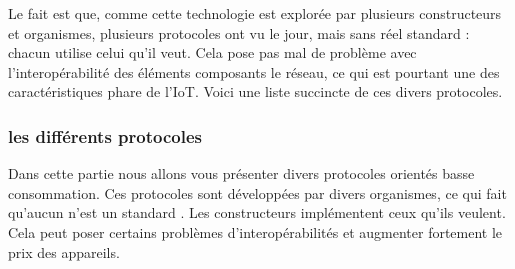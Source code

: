 Le fait est que, comme cette technologie est explorée par plusieurs constructeurs et organismes, plusieurs protocoles ont vu le jour, mais sans réel standard : chacun utilise celui qu'il veut. Cela pose pas mal de problème avec l'interopérabilité des éléments composants le réseau, ce qui est pourtant une des caractéristiques phare de l'IoT. Voici une liste succincte de ces divers protocoles.

\subsubsection{les différents protocoles}

Dans cette partie nous allons vous présenter divers protocoles orientés basse consommation. Ces protocoles sont développées par divers organismes, ce qui fait qu'aucun n'est un standard . Les constructeurs implémentent ceux qu’ils veulent. Cela peut poser certains problèmes d'interopérabilités et augmenter fortement le prix des appareils.

